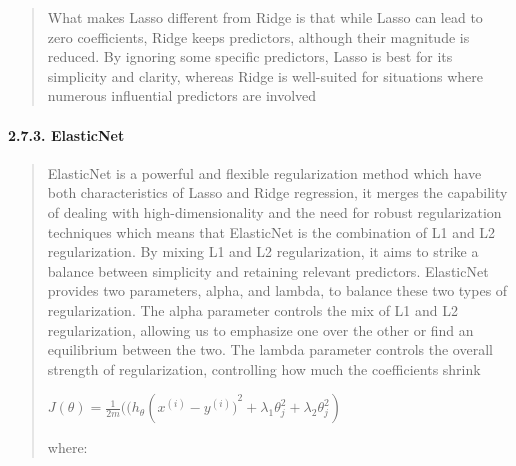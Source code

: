 \documentclass[
]{article}
\begin{document}
\begin{quote}
What makes Lasso different from Ridge is that while Lasso can lead to
zero coefficients, Ridge keeps predictors, although their magnitude is
reduced. By ignoring some specific predictors, Lasso is best for its
simplicity and clarity, whereas Ridge is well-suited for situations
where numerous influential predictors are involved
\end{quote}

\hypertarget{elasticnet}{%
\paragraph{\texorpdfstring{\textbf{2.7.3.
ElasticNet}}{2.7.3. ElasticNet}}\label{elasticnet}}

\begin{quote}
ElasticNet is a powerful and flexible regularization method which have
both characteristics of Lasso and Ridge regression, it merges the
capability of dealing with high-dimensionality and the need for robust
regularization techniques which means that ElasticNet is the combination
of L1 and L2 regularization. By mixing L1 and L2 regularization, it aims
to strike a balance between simplicity and retaining relevant
predictors. ElasticNet provides two parameters, alpha, and lambda, to
balance these two types of regularization. The alpha parameter controls
the mix of L1 and L2 regularization, allowing us to emphasize one over
the other or find an equilibrium between the two. The lambda parameter
controls the overall strength of regularization, controlling how much
the coefficients shrink

\(J(\theta) = \frac{1}{2m}((h_{\theta}(x^{(i)} - {y^{(i)})}^{2} + \lambda_{1}\theta_{j}^{2} + \lambda_{2}\theta_{j}^{2})\)

where:
\end{quote}
\end{document}
